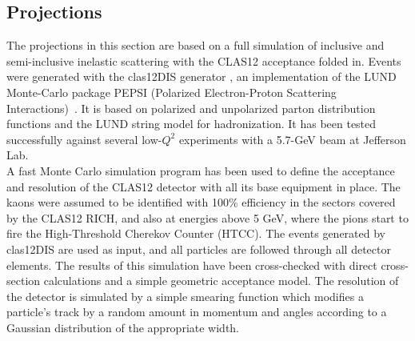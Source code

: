 \subsection{Projections}
%
The projections in this section are based on a full simulation of inclusive and semi-inclusive inelastic scattering with the CLAS12 acceptance folded in. Events were generated with the clas12DIS generator \cite{CLAS12DIS}, an implementation of the LUND Monte-Carlo package PEPSI (Polarized Electron-Proton Scattering Interactions)~\cite{Mankiewicz:1991dp}. 
It is based on polarized and unpolarized parton distribution functions and the LUND string model for hadronization.
It has been tested successfully against several low-$Q^2$ experiments with a 5.7-GeV beam at Jefferson Lab.\\

A fast Monte Carlo simulation program  has been used to define the acceptance and resolution of the CLAS12 detector with all its base equipment in place. The kaons were assumed to be identified with 100\% efficiency in the sectors covered by the CLAS12 RICH, and also at energies above 5 GeV, where the pions start to fire the High-Threshold Cherekov Counter (HTCC). 
The events generated by clas12DIS are used as input, and all particles are followed through all detector elements. 
The results of this simulation have been cross-checked with direct cross-section calculations and a simple geometric acceptance model. The resolution of the detector is simulated by a simple smearing function which modifies a particle's track by a random amount in momentum and angles according to a Gaussian distribution of the appropriate width.

%
